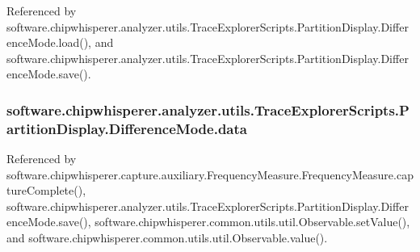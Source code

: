 Referenced by software.\+chipwhisperer.\+analyzer.\+utils.\+Trace\+Explorer\+Scripts.\+Partition\+Display.\+Difference\+Mode.\+load(), and software.\+chipwhisperer.\+analyzer.\+utils.\+Trace\+Explorer\+Scripts.\+Partition\+Display.\+Difference\+Mode.\+save().

\hypertarget{classsoftware_1_1chipwhisperer_1_1analyzer_1_1utils_1_1TraceExplorerScripts_1_1PartitionDisplay_1_1DifferenceMode_a9a04438b710bd74ede752e9a0b700b6d}{}
\subsubsection[{data}]{\setlength{\rightskip}{0pt plus 5cm}software.\+chipwhisperer.\+analyzer.\+utils.\+Trace\+Explorer\+Scripts.\+Partition\+Display.\+Difference\+Mode.\+data}\label{classsoftware_1_1chipwhisperer_1_1analyzer_1_1utils_1_1TraceExplorerScripts_1_1PartitionDisplay_1_1DifferenceMode_a9a04438b710bd74ede752e9a0b700b6d}


Referenced by software.\+chipwhisperer.\+capture.\+auxiliary.\+Frequency\+Measure.\+Frequency\+Measure.\+capture\+Complete(), software.\+chipwhisperer.\+analyzer.\+utils.\+Trace\+Explorer\+Scripts.\+Partition\+Display.\+Difference\+Mode.\+save(), software.\+chipwhisperer.\+common.\+utils.\+util.\+Observable.\+set\+Value(), and software.\+chipwhisperer.\+common.\+utils.\+util.\+Observable.\+value().

\hypertarget{classsoftware_1_1chipwhisperer_1_1analyzer_1_1utils_1_1TraceExplorerScripts_1_1PartitionDisplay_1_1DifferenceMode_a5557d2380c22894d9ea79813b4581cd7}{}

